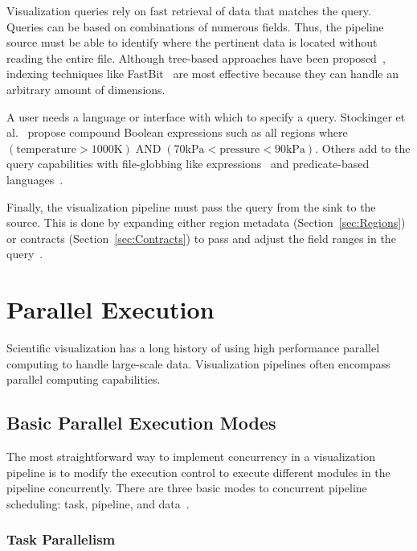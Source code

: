 \documentclass[journal,onecolumn,12pt,letterpaper,twoside]{IEEEtran}
\newcommand*{\lcite}[1]{~\cite{#1}}
\newcommand*{\scite}[1]{~\cite{#1}}
\newcommand{\etal}{et al.}
\begin{document}
Visualization queries rely on fast retrieval of data that matches the
query.  Queries can be based on combinations of numerous fields.  Thus, the
pipeline source must be able to identify where the pertinent data is
located without reading the entire file.  Although tree-based approaches
have been proposed\lcite{Chiang1998}, indexing techniques like
FastBit\lcite{FastBit,Wu2010} are most effective because they can handle an
arbitrary amount of dimensions.

A user needs a language or interface with which to specify a query.
Stockinger \etal\scite{Stockinger2005} propose compound Boolean expressions
such as all regions where $(\mathrm{temperature} > 1000\mathrm{K}) \;
\mathrm{AND} \; (70\mathrm{kPa} < \mathrm{pressure} < 90\mathrm{kPa})$.
Others add to the query capabilities with file-globbing like
expressions\lcite{Glatter2008} and predicate-based
languages\lcite{Johnson2009}.

Finally, the visualization pipeline must pass the query from the sink to
the source.  This is done by expanding either region metadata
(Section~\ref{sec:Regions}) or contracts (Section~\ref{sec:Contracts}) to
pass and adjust the field ranges in the query\lcite{Rubel2008}.


\section{Parallel Execution}
\label{sec:ParallelExecution}

Scientific visualization has a long history of using high performance
parallel computing to handle large-scale data.  Visualization pipelines
often encompass parallel computing capabilities.

\subsection{Basic Parallel Execution Modes}
\label{sec:ParallelExecution:Modes}

The most straightforward way to implement concurrency in a visualization
pipeline is to modify the execution control to execute different modules
in the pipeline concurrently.  There are three basic modes to concurrent
pipeline scheduling: task, pipeline, and data\lcite{Ahrens2000}.

\subsubsection{Task Parallelism}
\label{sec:TaskParallelism}
\end{document}
